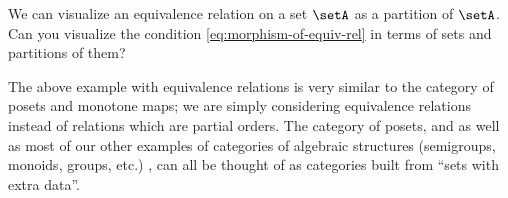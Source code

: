 \begin{exercise}
    We can visualize an equivalence relation on a set $\setA$ as a partition of $\setA$.
    Can you visualize the condition \cref{eq:morphism-of-equiv-rel} in terms of sets and partitions of them?
\end{exercise}

\begin{solution}
\end{solution}

\begin{remark}
    The above example with equivalence relations is very similar to the category of posets and monotone maps; we are simply considering equivalence relations instead of relations which are partial orders.
    The category of posets, and as well as most of our other examples of categories of algebraic structures (semigroups, monoids, groups, etc.)
    , can all be thought of as categories built from ``sets with extra data''.
\end{remark}
